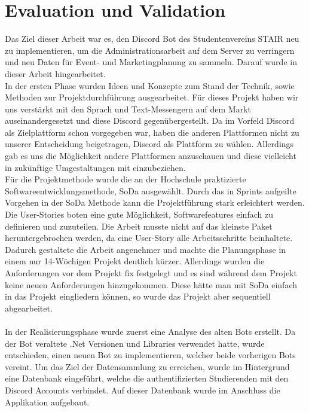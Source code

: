 \documentclass[a4paper, table]{article}
\begin{document}
\newpage
\section{Evaluation und Validation}
Das Ziel dieser Arbeit war es, den Discord Bot des Studentenvereins STAIR neu zu implementieren, um die Administrationsarbeit auf dem Server zu verringern und neu Daten für Event- und Marketingplanung zu sammeln. 
Darauf wurde in dieser Arbeit hingearbeitet.\\
In der ersten Phase wurden Ideen und Konzepte zum Stand der Technik, sowie Methoden zur Projektdurchführung ausgearbeitet. 
Für dieses Projekt haben wir uns verstärkt mit den Sprach und Text-Messengern auf dem Markt auseinandergesetzt und diese Discord gegenübergestellt. 
Da im Vorfeld Discord als Zielplattform schon vorgegeben war, haben die anderen Plattformen nicht zu unserer Entscheidung beigetragen, Discord als Plattform zu wählen. 
Allerdings gab es uns die Möglichkeit andere Plattformen anzuschauen und diese vielleicht in zukünftige Umgestaltungen mit einzubeziehen.\\
Für die Projektmethode wurde die an der Hochschule praktizierte Softwareentwicklungsmethode, \gls{SoDa} ausgewählt. 
Durch das in Sprints aufgeilte Vorgehen in der SoDa Methode kann die Projektführung stark erleichtert werden.
Die User-Stories boten eine gute Möglichkeit, Softwarefeatures einfach zu definieren und zuzuteilen. 
Die Arbeit musste nicht auf das kleinste Paket heruntergebrochen werden, da eine User-Story alle Arbeitsschritte beinhaltete. 
Dadurch gestaltete die Arbeit angenehmer und machte die Planungsphase in einem nur 14-Wöchigen Projekt deutlich kürzer. 
Allerdings wurden die Anforderungen vor dem Projekt fix festgelegt und es sind während dem Projekt keine neuen Anforderungen hinzugekommen. 
Diese hätte man mit SoDa einfach in das Projekt eingliedern können, so wurde das Projekt aber sequentiell abgearbeitet.\\\\
In der Realisierungsphase wurde zuerst eine Analyse des alten Bots erstellt. 
Da der Bot veraltete .Net Versionen und Libraries verwendet hatte, wurde entschieden, einen neuen Bot zu implementieren, welcher beide vorherigen Bots vereint. 
Um das Ziel der Datensammlung zu erreichen, wurde im Hintergrund eine Datenbank eingeführt, welche die authentifizierten Studierenden mit den Discord Accounts verbindet. 
Auf dieser Datenbank wurde im Anschluss die Applikation aufgebaut.\\\\
\end{document}
